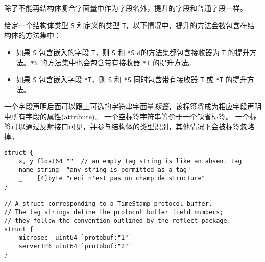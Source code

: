 除了不能再结构体复合字面量中作为字段名外，提升的字段和普通字段一样。

给定一个结构体类型 \lstinline|S| 和定义的类型 \lstinline|T|，以下情况中，提升的方法会被包含在结构体的方法集中：
\begin{itemize}
\item 如果 \lstinline|S| 包含嵌入的字段 \lstinline|T|，则 \lstinline|S| 和 \lstinline|*S| d的方法集都包含接收器为 \lstinline|T| 的提升方法。\lstinline|*S| 的方法集中也会包含带有接收器 \lstinline|*T| 的提升方法。
\item  如果 \lstinline|S| 包含嵌入字段 \lstinline|*T|，则 \lstinline|S| 和 \lstinline|*S| 同时包含带有接收器 \lstinline|T| 或 \lstinline|*T| 的提升方法。
\end{itemize}

一个字段声明后面可以跟上可选的字符串字面量\emph{标签}，该标签将成为相应字段声明中所有字段的属性(attribute)。
一个空标签字符串等价于一个缺省标签。
一个标签可以通过反射接口可见，并参与结构体的类型识别，其他情况下会被标签忽略掉。
\begin{lstlisting}[style=golang]
struct {
	x, y float64 ""  // an empty tag string is like an absent tag
	name string  "any string is permitted as a tag"
	_    [4]byte "ceci n'est pas un champ de structure"
}

// A struct corresponding to a TimeStamp protocol buffer.
// The tag strings define the protocol buffer field numbers;
// they follow the convention outlined by the reflect package.
struct {
	microsec  uint64 `protobuf:"1"`
	serverIP6 uint64 `protobuf:"2"`
}
\end{lstlisting}
